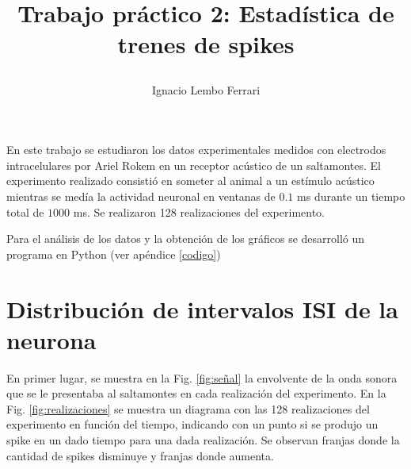 \documentclass[11pt,twocolumn,twoside]{opticajnl}
\title{

\vspace{0.5cm} 

Trabajo práctico 2: Estadística de trenes de spikes}
\author[1]{\huge{Ignacio Lembo Ferrari}}
\affil[1]{\large{ignaciolembo@ib.edu.ar} 

\vspace{0.3cm}

\large{28 de septiembre de 2023.}

\vspace{0.5cm}
}
\begin{document}
\maketitle

En este trabajo se estudiaron los datos experimentales medidos con electrodos intracelulares por Ariel Rokem en un receptor acústico de un saltamontes. El experimento realizado consistió en someter al animal a un estímulo acústico mientras se medía la actividad neuronal en ventanas de $0.1$ ms durante un tiempo total de $1000$ ms. Se realizaron 128 realizaciones del experimento.

Para el análisis de los datos y la obtención de los gráficos se desarrolló un programa en Python (ver apéndice \ref{codigo})

\section{Distribución de intervalos ISI de la neurona \label{sec:ISI}}

\vspace{0.3cm}

En primer lugar, se muestra en la Fig. \ref{fig:señal} la envolvente de la onda sonora que se le presentaba al saltamontes en cada realización del experimento. En la Fig. \ref{fig:realizaciones} se muestra un diagrama con las 128 realizaciones del experimento en función del tiempo, indicando con un punto si se produjo un spike en un dado tiempo para una dada realización. Se observan franjas donde la cantidad de spikes disminuye y franjas donde aumenta.
\end{document}
